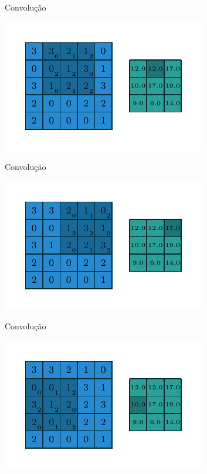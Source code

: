 \documentclass[10pt]{beamer}
\begin{document}
\begin{frame}{Convolução}
\begin{center}
\includegraphics[scale=1.5]{images/numerical_no_padding_no_strides_01.pdf}
\end{center}
\end{frame}

\begin{frame}{Convolução}
\begin{center}
\includegraphics[scale=1.5]{images/numerical_no_padding_no_strides_02.pdf}
\end{center}
\end{frame}



\begin{frame}{Convolução}
\begin{center}
\includegraphics[scale=1.5]{images/numerical_no_padding_no_strides_03.pdf}
\end{center}
\end{frame}
\end{document}
